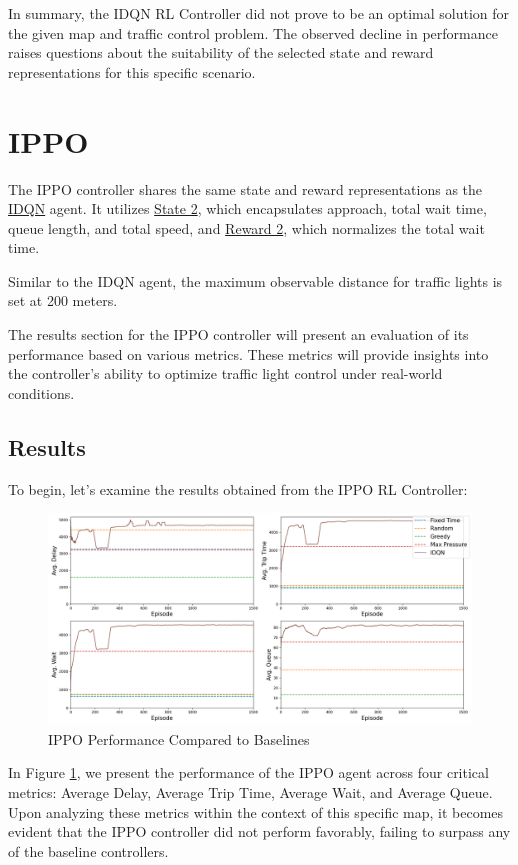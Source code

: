 In summary, the IDQN RL Controller did not prove to be an optimal solution for the given map and traffic control problem. The observed decline in performance raises questions about the suitability of the selected state and reward representations for this specific scenario.

\section{IPPO}
The IPPO controller shares the same state and reward representations as the \hyperref[sec:exp-idqn]{IDQN} agent. It utilizes \hyperref[subsec:state-2]{State 2}, which encapsulates approach, total wait time, queue length, and total speed, and \hyperref[subsec:reward-2]{Reward 2}, which normalizes the total wait time.

Similar to the IDQN agent, the maximum observable distance for traffic lights is set at 200 meters.

The results section for the IPPO controller will present an evaluation of its performance based on various metrics. These metrics will provide insights into the controller's ability to optimize traffic light control under real-world conditions.

\subsection{Results}
To begin, let's examine the results obtained from the IPPO RL Controller:

\begin{figure}[h]
    \centering
    \includegraphics[width=1\linewidth]{images/experiments/IPPO.png}
    \caption{IPPO Performance Compared to Baselines}
    \label{fig:ippo_results}
\end{figure}

In Figure \ref{fig:ippo_results}, we present the performance of the IPPO agent across four critical metrics: Average Delay, Average Trip Time, Average Wait, and Average Queue. Upon analyzing these metrics within the context of this specific map, it becomes evident that the IPPO controller did not perform favorably, failing to surpass any of the baseline controllers.

